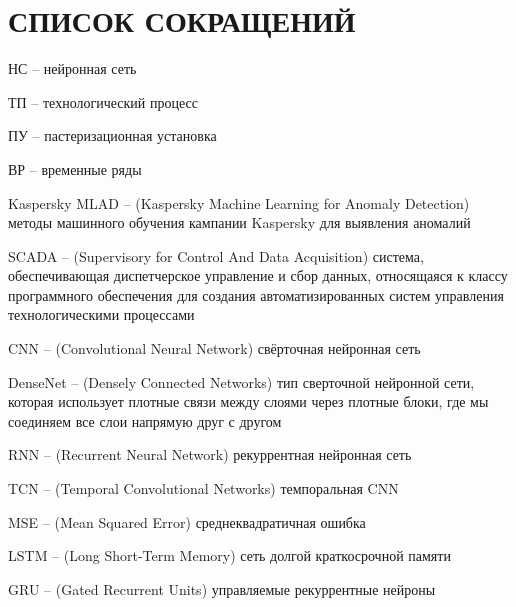\sectionbreak \section*{ 
    \gostTitleFont
    \redline
    СПИСОК СОКРАЩЕНИЙ
}
\titlespace

{\gostFont

\par \redline НС {--} нейронная сеть

\par \redline ТП {--} технологический процесс 

\par \redline ПУ {--} пастеризационная установка

\par \redline ВР {--} временные ряды

\par \redline Kaspersky MLAD {--} (Kaspersky Machine Learning for Anomaly Detection) методы машинного обучения кампании Kaspersky для выявления аномалий

\par \redline SCADA {--} (Supervisory for Control And Data Acquisition) система, обеспечивающая диспетчерское управление и сбор данных, относящаяся к классу программного обеспечения для создания автоматизированных систем управления технологическими процессами

\par \redline CNN {--} (Convolutional Neural Network) свёрточная нейронная сеть

\par \redline DenseNet {--} (Densely Connected Networks) тип сверточной нейронной сети, которая использует плотные связи между слоями через плотные блоки, где мы соединяем все слои напрямую друг с другом

\par \redline RNN {--} (Recurrent Neural Network) рекуррентная нейронная сеть

\par \redline TCN {--} (Temporal Convolutional Networks) темпоральная CNN

\par \redline MSE {--} (Mean Squared Error) среднеквадратичная ошибка

\par \redline LSTM {--} (Long Short-Term Memory) сеть долгой краткосрочной памяти

\par \redline GRU {--} (Gated Recurrent Units) управляемые рекуррентные нейроны

\par 

}
